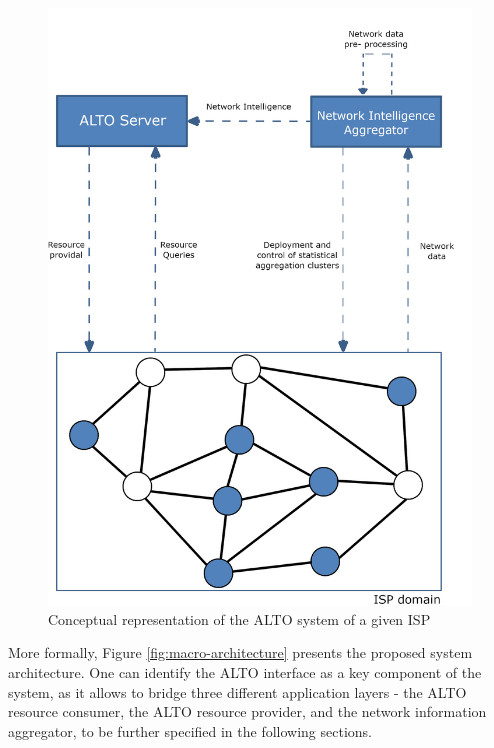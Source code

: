 \begin{figure}[!h]
        \centering
        \hspace*{0.35cm}
        \includegraphics[scale=0.75]{img/architecture-network.png}
        \caption{Conceptual representation of the ALTO system of a given ISP}
        \label{fig:architecture-network}
\end{figure}

    More formally, Figure \ref{fig:macro-architecture} presents the proposed system architecture.
    One can identify the ALTO interface as a key component of the system, as it allows to bridge three different application layers - the ALTO resource consumer, the ALTO resource provider, and the network information aggregator, to be further specified in the following sections.

